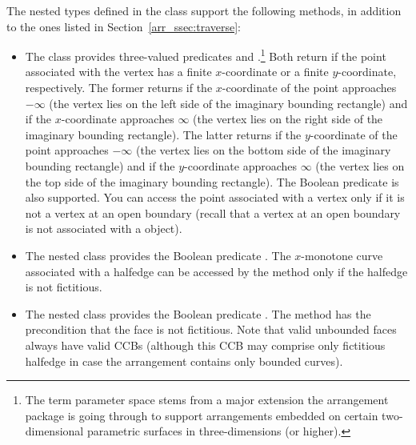 \begin{ccAdvanced}
The nested types defined in the  class support the
following methods, in addition to the ones listed in
Section~\ref{arr_ssec:traverse}:
\begin{itemize}
\item
 The  class provides three-valued predicates
   and
  .\footnote{The term parameter space
    stems from a major extension the arrangement package is going
    through to support arrangements embedded on certain
    two-dimensional parametric surfaces in three-dimensions (or
    higher).} Both return  if the point associated
  with the vertex has a finite $x$-coordinate or a finite
  $y$-coordinate, respectively. The former returns
   if the $x$-coordinate of the point
  approaches $-\infty$ (the vertex lies on the left side of the
  imaginary bounding rectangle) and  if the
  $x$-coordinate approaches $\infty$ (the vertex lies on the right
  side of the imaginary bounding rectangle). The latter returns
   if the $y$-coordinate of the point
  approaches $-\infty$ (the vertex lies on the bottom side of the
  imaginary bounding rectangle) and  if the
  $y$-coordinate approaches $\infty$ (the vertex lies on the top side
  of the imaginary bounding rectangle). The Boolean predicate
   is also supported. You can access the
  point associated with a vertex only if it is not a vertex at an open
  boundary (recall that a vertex at an open boundary is not associated
  with a  object).
%
\item
  The nested  class provides the Boolean predicate
  . The $x$-monotone curve associated with
  a halfedge can be accessed by the  method only if the
  halfedge is not fictitious.
%
\item
  The nested  class provides the Boolean predicate
  . The method  has the
  precondition that the face is not fictitious. Note that valid
  unbounded faces always have valid CCBs (although this CCB may
  comprise only fictitious halfedge in case the arrangement contains
  only bounded curves).
\end{itemize}


\end{ccAdvanced}
